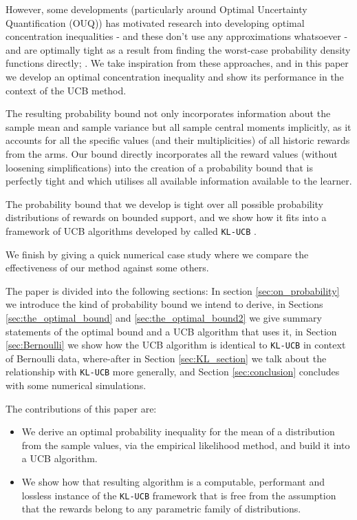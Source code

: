 \documentclass[12pt]{colt2020} %
\begin{document}
However, some developments (particularly around Optimal Uncertainty Quantification (OUQ)) has motivated research into developing optimal concentration inequalities - and these don't use any approximations whatsoever - and are optimally tight as a result from finding the worst-case probability density functions directly; \cite{doi:10.1137/10080782X,articleasfasfas}.
We take inspiration from these approaches, and in this paper we develop an optimal concentration inequality and show its performance in the context of the UCB method.

The resulting probability bound not only incorporates information about the sample mean and sample variance but all sample central moments implicitly, as it accounts for all the specific values (and their multiplicities) of all historic rewards from the arms.
Our bound directly incorporates all the reward values (without loosening simplifications) into the creation of a probability bound that is perfectly tight and which utilises all available information available to the learner.

The probability bound that we develop is tight over all possible probability distributions of rewards on bounded support, and we show how it fits into a framework of UCB algorithms developed by \cite{cappe2013} called \texttt{KL-UCB} .

We finish by giving a quick numerical case study where we compare the effectiveness of our method against some others.

The paper is divided into the following sections: In section \ref{sec:on_probability} we introduce the kind of probability bound we intend to derive, in Sections \ref{sec:the_optimal_bound} and \ref{sec:the_optimal_bound2} we give summary statements of the optimal bound and a UCB algorithm that uses it, in Section \ref{sec:Bernoulli} we show how the UCB algorithm is identical to \texttt{KL-UCB} in context of Bernoulli data, where-after in Section \ref{sec:KL_section} we talk about the relationship with \texttt{KL-UCB} more generally, and Section \ref{sec:conclusion} concludes with some numerical simulations.

The contributions of this paper are:
\begin{itemize}
\item We derive an optimal probability inequality for the mean of a distribution from the sample values, via the empirical likelihood method, and build it into a UCB algorithm.
\item We show how that resulting algorithm is a computable, performant and lossless instance of the \texttt{KL-UCB} framework that is free from the assumption that the rewards belong to any parametric family of distributions.
\end{itemize}
\end{document}
